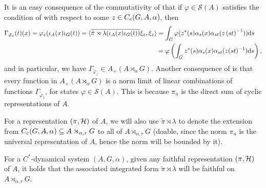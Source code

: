 \begin{remark}
It is an easy consequence of the commutativity of  that if $\varphi \in \mathcal{S}(A)$ satisfies the condition of  with respect to some $z \in C_c(G,A,\alpha)$, then 
\begin{align*}
\Gamma_{\tilde \varphi_z}(t)(x) = \varphi_z(\iota_A(x)  \iota_G(t)) = \langle \overline{\tilde \pi \rtimes \lambda(\iota_A(x) \iota_G(t))} \xi_z , \xi_z\rangle & = \int_G \varphi(z^*(s)\alpha_s(x)\alpha_{st}(z\left( st \right)^{-1})) \mathrm{d} s \\
&= \varphi\left( \int_G z^*(s) \alpha_s(x) \alpha_{st}(z(st)^{-1})\mathrm{d} s \right),
\end{align*}
and in particular, we have $\Gamma_{\tilde \varphi_z} \in A_+(A \rtimes_\alpha G)$. Another consequence of  is that every function in $A_+(A \rtimes_\alpha G)$ is a norm limit of linear combinations of functions $\Gamma_{\tilde \varphi_z}$, for states $\varphi \in \mathcal{S}(A)$. This is because $\pi_u$ is the direct sum of cyclic representations of $A$.
\end{remark}
For a representation $(\pi,\mathcal{H})$ of $A$, we will also use $\tilde \pi \rtimes \lambda$ to denote the extension from $C_c(G,A,\alpha)\subseteq A \rtimes_{\alpha,r}G$ to all of $A \rtimes_{\alpha, r} G$ (doable, since the norm $\pi_u$ is the universal representation of $A$, hence the norm will be bounded by it). 
\begin{theorem}
For a $C^*$-dynamical system $(A,G,\alpha)$, given any faithful representation $(\pi,\mathcal{H})$ of $A$, it holds that the associated integrated form $\tilde \pi \rtimes \lambda$ will be faithful on $A \rtimes_{\alpha, r} G$.
\label{mult:reducedfaithful}
\end{theorem}

